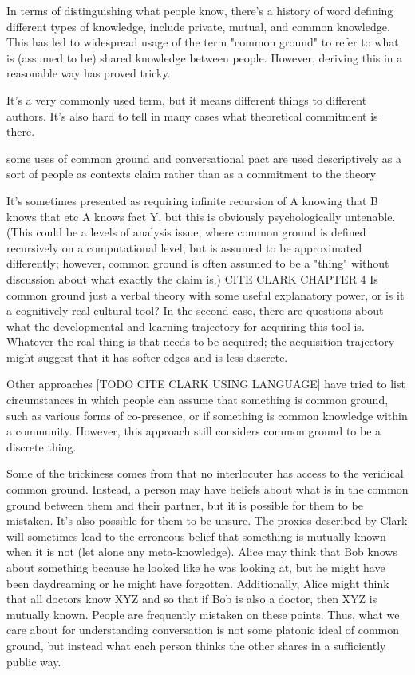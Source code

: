 \documentclass[]{article}
\begin{document}
In terms of distinguishing what people know, there's a history of word defining different types of knowledge, include private, mutual, and common knowledge. This has led to widespread usage of the term "common ground" to refer to what is (assumed to be) shared knowledge between people. However, deriving this in a reasonable way has proved tricky.

It's a very commonly used term, but it means different things to different authors. It's also hard to tell in many cases what theoretical commitment is there. 

some uses of common ground and conversational pact are used descriptively as a sort of people as contexts claim \cite{leung2023} rather than as a commitment to the theory 

It's sometimes presented as requiring infinite recursion of A knowing that B knows that etc A knows fact Y, but this is obviously psychologically untenable. (This could be a levels of analysis issue, where common ground is defined recursively on a computational level, but is assumed to be approximated differently; however, common ground is often assumed to be a "thing" without discussion about what exactly the claim is.) CITE CLARK CHAPTER 4 Is common ground just a verbal theory with some useful explanatory power, or is it a cognitively real cultural tool? In the second case, there are questions about what the developmental and learning trajectory for acquiring this tool is. Whatever the real thing is that needs to be acquired; the acquisition trajectory might suggest that it has softer edges and is less discrete. 

Other approaches [TODO CITE CLARK USING LANGUAGE] have tried to list circumstances in which people can assume that something is common ground, such as various forms of co-presence, or if something is common knowledge within a community. However, this approach still considers common ground to be a discrete thing. 

Some of the trickiness comes from that no interlocuter has access to the veridical common ground. Instead, a person may have beliefs about what is in the common ground between them and their partner, but it is possible for them to be mistaken. It's also possible for them to be unsure. The proxies described by Clark will sometimes lead to the erroneous belief that something is mutually known when it is not (let alone any meta-knowledge). Alice may think that Bob knows about something because he looked like he was looking at, but he might have been daydreaming or he might have forgotten. Additionally, Alice might think that all doctors know XYZ and so that if Bob is also a doctor, then XYZ is mutually known. People are frequently mistaken on these points. Thus, what we care about for understanding conversation is not some platonic ideal of common ground, but instead what each person thinks the other shares in a sufficiently public way. 
\end{document}
